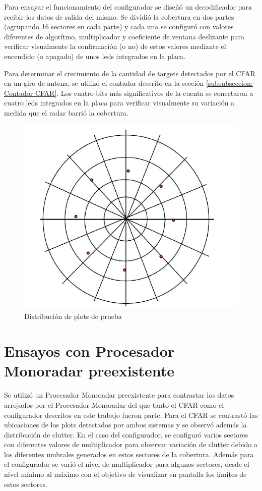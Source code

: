 Para ensayar el funcionamiento del configurador se diseñó un decodificador para recibir los datos de salida del mismo. Se dividió la cobertura en dos partes (agrupando 16 sectores en cada parte) y cada una se configuró con valores diferentes de algorítmo, multiplicador y coeficiente de ventana deslizante para verificar visualmente la confirmación (o no) de estos valores mediante el encendido (o apagado) de unos leds integrados en la placa.

Para determinar el crecimiento de la cantidad de targets detectados por el CFAR en un giro de antena, se utilizó el contador descrito en la sección \ref{subsubseccion: Contador CFAR}. Los cuatro bits más significativos de la cuenta se conectaron a cuatro leds integrados en la placa para verificar visualmente su variación a medida que el radar barrió la cobertura.

\begin{figure}
\centering
\includegraphics[scale=0.5]{./Figures/plots_simulador.png}
\caption{Distribución de plots de prueba}
\label{fig: plots simulador}
\end{figure}


\section{Ensayos con Procesador Monoradar preexistente}
\label{Ensayos_Procesador_Monoradar_preexistente}
Se utilizó un Procesador Monoradar preexistente para contrastar los datos arrojados por el Procesador Monoradar del que tanto el CFAR como el configurador descritos en este trabajo fueron parte. Para el CFAR se contrastó las ubicaciones de los plots detectados por ambos sistemas y se observó además la distribución de clutter. En el caso del configurador, se configuró varios sectores con diferentes valores de multiplicador para observar variación de clutter debido a los diferentes umbrales generados en estos sectores de la cobertura. Además para el configurador se varió el nivel de multiplicador  para algunos sectores, desde el nivel mínimo al máximo con el objetivo de visualizar en pantalla los límites de estos sectores.






